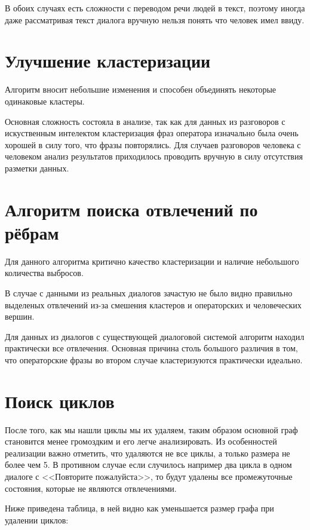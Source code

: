 \documentclass[specification,annotation]{itmo-student-thesis}
\begin{document}
	В обоих случаях есть сложности с переводом речи людей в текст, поэтому иногда даже рассматривая текст диалога вручную нельзя понять что человек имел ввиду.
	
	\section{Улучшение кластеризации}
	Алгоритм вносит небольшие изменения и способен объединять некоторые одинаковые кластеры. 
	
	Основная сложность состояла в анализе, так как для данных из разговоров с искуственным интелектом кластеризация фраз оператора изначально была очень хорошей в силу того, что фразы повторялись. Для случаев разговоров человека с человеком анализ результатов приходилось проводить вручную в силу отсутствия разметки данных.
		
	\section{Алгоритм поиска отвлечений по рёбрам}
	Для данного алгоритма критично качество кластеризации и наличие небольшого количества выбросов. 
		
	В случае с данными из реальных диалогов зачастую не было видно правильно выделеных отвлечений из-за смешения кластеров и операторских и человеческих вершин.
		
	Для данных из диалогов с существующей диалоговой системой алгоритм находил практически все отвлечения. Основная причина столь большого различия в том, что операторские фразы во втором случае кластеризуются практически идеально.
	
	\section{Поиск циклов}
	После того, как мы нашли циклы мы их удаляем, таким образом основной граф становится менее громоздким и его легче анализировать. Из особенностей реализации важно отметить, что удаляются не все циклы, а только размера не более чем 5. В противном случае если случилось например два цикла в одном диалоге с <<Повторите пожалуйста>>, то будут удалены все промежуточные состояния, которые не являются отвлечениями.%
	
	Ниже приведена таблица, в ней видно как уменьшается размер графа при удалении циклов:
	
\end{document}
